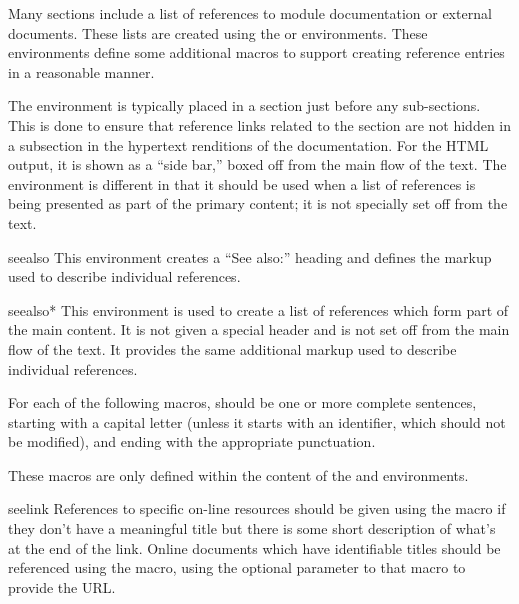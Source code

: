 \documentclass{howto}
\begin{document}
    Many sections include a list of references to module documentation
    or external documents.  These lists are created using the
     or  environments.  These environments
    define some additional macros to support creating reference
    entries in a reasonable manner.

    The  environment is typically placed in a section
    just before any sub-sections.  This is done to ensure that
    reference links related to the section are not hidden in a
    subsection in the hypertext renditions of the documentation.  For
    the HTML output, it is shown as a ``side bar,'' boxed off from the
    main flow of the text.  The  environment is
    different in that it should be used when a list of references is
    being presented as part of the primary content; it is not
    specially set off from the text.

    \begin{envdesc}{seealso}{}
      This environment creates a ``See also:'' heading and defines the
      markup used to describe individual references.
    \end{envdesc}

    \begin{envdesc}{seealso*}{}
      This environment is used to create a list of references which
      form part of the main content.  It is not given a special
      header and is not set off from the main flow of the text.  It
      provides the same additional markup used to describe individual
      references.
    \end{envdesc}

    For each of the following macros,  should be one or more
    complete sentences, starting with a capital letter (unless it
    starts with an identifier, which should not be modified), and
    ending with the appropriate punctuation.

    These macros are only defined within the content of the
     and  environments.

    \begin{macrodesc}{seelink}{}
      References to specific on-line resources should be given using
      the  macro if they don't have a meaningful title
      but there is some short description of what's at the end of the
      link.  Online documents which have identifiable titles should be
      referenced using the  macro, using the optional
      parameter to that macro to provide the URL.
    \end{macrodesc}
\end{document}
